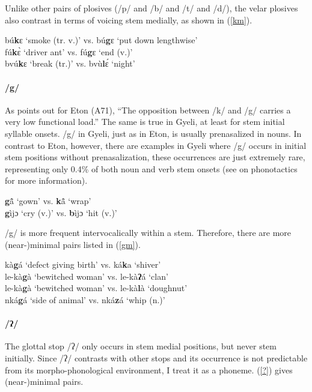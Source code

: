 \noindent Unlike other pairs of plosives (/p/ and /b/ and /t/ and /d/), the velar plosives also contrast in terms of voicing stem medially, as shown in (\ref{km}).

\begin{exe} \ex \label{km}
bú{\bfseries k}ɛ `smoke (tr. v.)' vs. bú{\bfseries g}ɛ `put down lengthwise' \\
fú{\bfseries k}ɛ̀ `driver ant' vs. fú{\bfseries g}ɛ `end (v.)' \\
bvú{\bfseries k}ɛ `break (tr.)' vs. bvù{\bfseries l}ɛ́ `night'
\end{exe}


\paragraph{\bfseries /g/} As \citet[10]{velde2008} points out for Eton (A71), ``The opposition between /k/ and /g/ carries a very low functional load.'' The same is true in Gyeli, at least for stem initial syllable onsets. /g/ in Gyeli, just as in Eton, is usually prenasalized in nouns. In contrast to Eton, however, there are examples in Gyeli where /g/ occurs in initial stem positions without prenasalization, these occurrences are just extremely rare, representing only 0.4\% of both noun and verb stem onsets (see  on phonotactics for more information).


\begin{exe} \ex \label{g}
{\bfseries g}ã̂ `gown' vs. {\bfseries k}ã̂ `wrap' \\
{\bfseries g}ìjɔ `cry (v.)' vs. {\bfseries b}ìjɔ `hit (v.)'
\end{exe}

\noindent /g/ is more frequent intervocalically within a stem. Therefore, there are more (near-)minimal pairs listed in (\ref{gm}).

\begin{exe} \ex \label{gm}
kà{\bfseries g}á `defect giving birth' vs. ká{\bfseries k}a `shiver' \\
le-kà{\bfseries g}à `bewitched woman' vs. le-kà{\bfseries ʔ}á `clan' \\
le-kà{\bfseries g}à `bewitched woman' vs. le-kà{\bfseries l}à `doughnut' \\
nká{\bfseries g}á `side of animal' vs. nká{\bfseries z}á `whip (n.)' 
\end{exe}



\paragraph{\bfseries /ʔ/} The glottal stop /ʔ/ only occurs in stem medial positions, but never stem initially. Since /ʔ/ contrasts with other stops and its occurrence is not predictable from its morpho-phonological environment, I treat it as a phoneme. (\ref{?}) gives (near-)minimal pairs.

